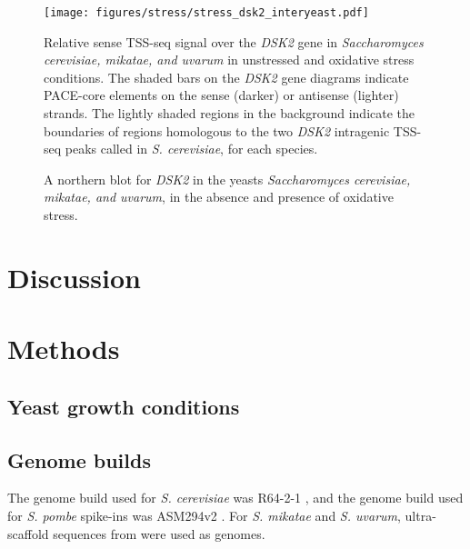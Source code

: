 \begin{figure}
    \texttt{[image: figures/stress/stress\_dsk2\_interyeast.pdf]}
    \caption[Sense TSS-seq signal over the \textit{DSK2} gene in \textit{Saccharomyces cerevisiae, mikatae, and uvarum} in unstressed and oxidative stress conditions.]{Relative sense TSS-seq signal over the \textit{DSK2} gene in \textit{Saccharomyces cerevisiae, mikatae, and uvarum} in unstressed and oxidative stress conditions. The shaded bars on the \textit{DSK2} gene diagrams indicate PACE-core elements on the sense (darker) or antisense (lighter) strands. The lightly shaded regions in the background indicate the boundaries of regions homologous to the two \textit{DSK2} intragenic TSS-seq peaks called in \textit{S. cerevisiae}, for each species.}
    \label{fig:stress_dsk2_interyeast}
\end{figure}

\begin{figure}
    \caption[A northern blot for \textit{DSK2} in the yeasts \textit{Saccharomyces cerevisiae, mikatae, and uvarum}, in the absence and presence of oxidative stress.]{A northern blot for \textit{DSK2} in the yeasts \textit{Saccharomyces cerevisiae, mikatae, and uvarum}, in the absence and presence of oxidative stress.}
\end{figure}


\section{Discussion}

\lipsum[1]

\section{Methods}

\subsection{Yeast growth conditions}

\subsection{Genome builds}

The genome build used for \textit{S. cerevisiae} was R64-2-1 \citep{engel2014}, and the genome build used for \textit{S. pombe} spike-ins was ASM294v2 \citep{wood2002}.
For \textit{S. mikatae} and \textit{S. uvarum}, ultra-scaffold sequences from \citet{scannell11} were used as genomes.

